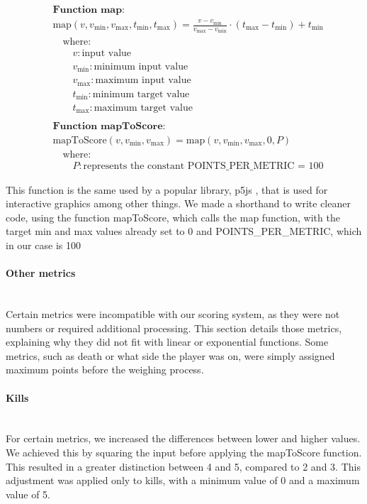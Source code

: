 \begin{align*}
& \textbf{Function map:} \\
& \text{map}(v, v_{\text{min}}, v_{\text{max}}, t_{\text{min}}, t_{\text{max}}) = \frac{v - v_{\text{min}}}{v_{\text{max}} - v_{\text{min}}} \cdot (t_{\text{max}} - t_{\text{min}}) + t_{\text{min}} \\
& \quad \text{where:}\\
& \quad \quad v: \text{input value}\\
& \quad \quad v_{\text{min}}: \text{minimum input value}\\
& \quad \quad v_{\text{max}}: \text{maximum input value}\\
& \quad \quad t_{\text{min}}: \text{minimum target value}\\
& \quad \quad t_{\text{max}}: \text{maximum target value}\\ \\
& \textbf{Function mapToScore:} \\
& \text{mapToScore}(v, v_{\text{min}}, v_{\text{max}}) = \text{map}(v, v_{\text{min}}, v_{\text{max}}, 0, P) \\
& \quad \text{where:}\\
& \quad \quad P:  \text{represents the constant POINTS\_PER\_METRIC = 100}
\end{align*}

This function is the same used by a popular library, p5js \cite{p5jsMap}, that is used for interactive graphics among other things. We made a shorthand to write cleaner code, using the function mapToScore, which calls the map function, with the target min and max values already set to 0 and POINTS\_PER\_METRIC, which in our case is 100



\paragraph{Other metrics}\mbox{}\\
Certain metrics were incompatible with our scoring system, as they were not numbers or required additional processing. This section details those metrics, explaining why they did not fit with linear or exponential functions. Some metrics, such as death or what side the player was on, were simply assigned maximum points before the weighing process.


\paragraph{Kills}\mbox{}\\
For certain metrics, we increased the differences between lower and higher values. We achieved this by squaring the input before applying the mapToScore function. This resulted in a greater distinction between 4 and 5, compared to 2 and 3. This adjustment was applied only to kills, with a minimum value of 0 and a maximum value of 5.


